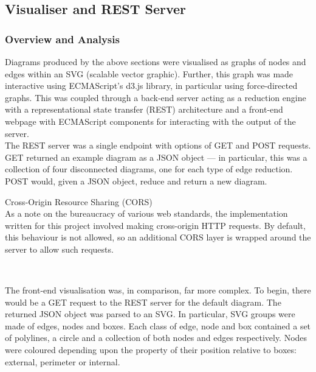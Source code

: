\subsection{Visualiser and REST Server}\label{ssec:rest-server}

    \subsubsection{Overview and Analysis}
        Diagrams produced by the above sections were visualised as graphs of nodes and edges within an SVG (scalable vector graphic).
        Further, this graph was made interactive using ECMAScript's d3.js library, in particular using force-directed graphs.
        This was coupled through a back-end server acting as a reduction engine with a representational state transfer (REST) architecture and a front-end webpage with ECMAScript components for interacting with the output of the server.\\

        The REST server was a single endpoint with options of GET and POST requests.
        GET returned an example diagram as a JSON object --- in particular, this was a collection of four disconnected diagrams, one for each type of edge reduction.
        POST would, given a JSON object, reduce and return a new diagram.
        
        \begin{remark*}{Cross-Origin Resource Sharing (CORS)\\}
            As a note on the bureaucracy of various web standards, the implementation written for this project involved making cross-origin HTTP requests.
            By default, this behaviour is not allowed, so an additional CORS layer is wrapped around the server to allow such requests.
        \end{remark*}~

        The front-end visualisation was, in comparison, far more complex.
        To begin, there would be a GET request to the REST server for the default diagram.
        The returned JSON object was parsed to an SVG.
        In particular, SVG groups were made of edges, nodes and boxes.
        Each class of edge, node and box contained a set of polylines, a circle and a collection of both nodes and edges respectively.
        Nodes were coloured depending upon the property of their position relative to boxes: external, perimeter or internal.\\

